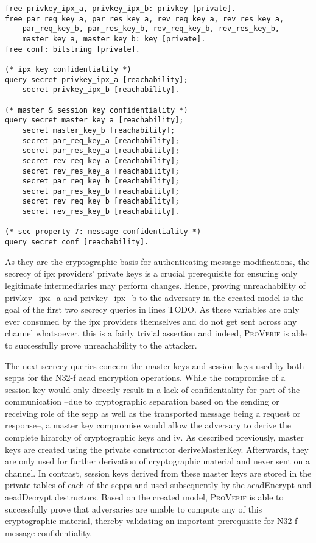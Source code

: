 \begin{lstlisting}[caption={Definition of custom one-way functions},label={lst:functions},firstnumber=224]
free privkey_ipx_a, privkey_ipx_b: privkey [private].
free par_req_key_a, par_res_key_a, rev_req_key_a, rev_res_key_a,
    par_req_key_b, par_res_key_b, rev_req_key_b, rev_res_key_b,
    master_key_a, master_key_b: key [private].
free conf: bitstring [private].

(* ipx key confidentiality *)
query secret privkey_ipx_a [reachability];
    secret privkey_ipx_b [reachability].

(* master & session key confidentiality *)
query secret master_key_a [reachability];
    secret master_key_b [reachability];
    secret par_req_key_a [reachability];
    secret par_res_key_a [reachability];
    secret rev_req_key_a [reachability];
    secret rev_res_key_a [reachability];
    secret par_req_key_b [reachability];
    secret par_res_key_b [reachability];
    secret rev_req_key_b [reachability];
    secret rev_res_key_b [reachability].

(* sec property 7: message confidentiality *)
query secret conf [reachability].
\end{lstlisting}

As they are the cryptographic basis for authenticating message modifications, the secrecy of \gls{ipx} providers' private keys is a crucial prerequisite for ensuring only legitimate intermediaries may perform changes.
Hence, proving unreachability of {\sffamily privkey\_ipx\_a} and {\sffamily privkey\_ipx\_b} to the adversary in the created model is the goal of the first two secrecy queries in lines TODO.
As these variables are only ever consumed by the \gls{ipx} providers themselves and do not get sent across any channel whatsoever, this is a fairly trivial assertion and indeed, \textsc{ProVerif} is able to successfully prove unreachability to the attacker.

The next secrecy queries concern the master keys and session keys used by both \glspl{sepp} for the N32-f \gls{aead} encryption operations.
While the compromise of a session key would only directly result in a lack of confidentiality for part of the communication --due to cryptographic separation based on the sending or receiving role of the \gls{sepp} as well as the transported message being a request or response--, a master key compromise would allow the adversary to derive the complete hirarchy of cryptographic keys and \gls{iv}.
As described previously, master keys are created using the private constructor {\sffamily deriveMasterKey}.
Afterwards, they are only used for further derivation of cryptographic material and never sent on a channel.
In contrast, session keys derived from these master keys are stored in the private tables of each of the \glspl{sepp} and used subsequently by the {\sffamily aeadEncrypt} and {\sffamily aeadDecrypt} destructors.
Based on the created model, \textsc{ProVerif} is able to successfully prove that adversaries are unable to compute any of this cryptographic material, thereby validating an important prerequisite for N32-f message confidentiality.

